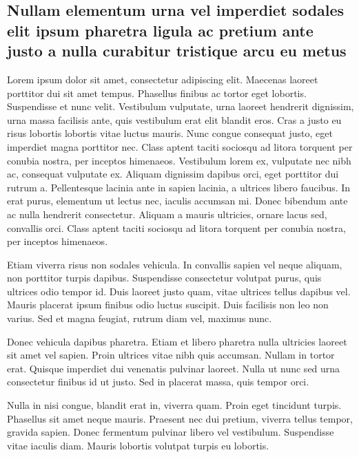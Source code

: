 \begin{apendicesenv}
\chapter{Nullam elementum urna vel imperdiet sodales elit ipsum pharetra ligula
ac pretium ante justo a nulla curabitur tristique arcu eu metus}
Lorem ipsum dolor sit amet, consectetur adipiscing elit. Maecenas laoreet porttitor dui sit amet tempus. Phasellus finibus ac tortor eget lobortis. Suspendisse et nunc velit. Vestibulum vulputate, urna laoreet hendrerit dignissim, urna massa facilisis ante, quis vestibulum erat elit blandit eros. Cras a justo eu risus lobortis lobortis vitae luctus mauris. Nunc congue consequat justo, eget imperdiet magna porttitor nec. Class aptent taciti sociosqu ad litora torquent per conubia nostra, per inceptos himenaeos. Vestibulum lorem ex, vulputate nec nibh ac, consequat vulputate ex. Aliquam dignissim dapibus orci, eget porttitor dui rutrum a. Pellentesque lacinia ante in sapien lacinia, a ultrices libero faucibus. In erat purus, elementum ut lectus nec, iaculis accumsan mi. Donec bibendum ante ac nulla hendrerit consectetur. Aliquam a mauris ultricies, ornare lacus sed, convallis orci. Class aptent taciti sociosqu ad litora torquent per conubia nostra, per inceptos himenaeos.

Etiam viverra risus non sodales vehicula. In convallis sapien vel neque aliquam, non porttitor turpis dapibus. Suspendisse consectetur volutpat purus, quis ultrices odio tempor id. Duis laoreet justo quam, vitae ultrices tellus dapibus vel. Mauris placerat ipsum finibus odio luctus suscipit. Duis facilisis non leo non varius. Sed et magna feugiat, rutrum diam vel, maximus nunc.

Donec vehicula dapibus pharetra. Etiam et libero pharetra nulla ultricies laoreet sit amet vel sapien. Proin ultrices vitae nibh quis accumsan. Nullam in tortor erat. Quisque imperdiet dui venenatis pulvinar laoreet. Nulla ut nunc sed urna consectetur finibus id ut justo. Sed in placerat massa, quis tempor orci.

Nulla in nisi congue, blandit erat in, viverra quam. Proin eget tincidunt turpis. Phasellus sit amet neque mauris. Praesent nec dui pretium, viverra tellus tempor, gravida sapien. Donec fermentum pulvinar libero vel vestibulum. Suspendisse vitae iaculis diam. Mauris lobortis volutpat turpis eu lobortis.

\end{apendicesenv}